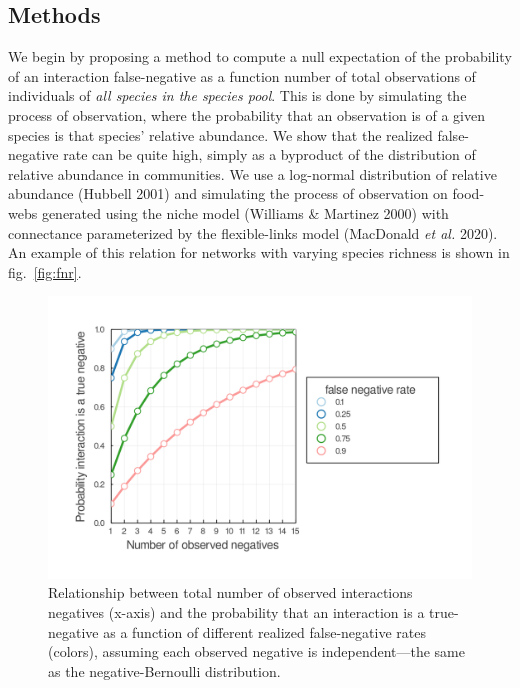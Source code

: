 \documentclass[11pt]{article}
\makeatletter
\def\maxwidth{\ifdim\Gin@nat@width>\linewidth\linewidth
\else\Gin@nat@width\fi}
\let\Oldincludegraphics\includegraphics
\renewcommand{\includegraphics}[1]{\Oldincludegraphics[width=\maxwidth]{#1}}
\makeatother
\begin{document}
\hypertarget{methods}{%
\subsection{Methods}\label{methods}}

We begin by proposing a method to compute a null expectation of the
probability of an interaction false-negative as a function number of
total observations of individuals of \emph{all species in the species
pool}. This is done by simulating the process of observation, where the
probability that an observation is of a given species is that species'
relative abundance. We show that the realized false-negative rate can be
quite high, simply as a byproduct of the distribution of relative
abundance in communities. We use a log-normal distribution of relative
abundance (Hubbell 2001) and simulating the process of observation on
food-webs generated using the niche model (Williams \& Martinez 2000)
with connectance parameterized by the flexible-links model (MacDonald
\emph{et al.} 2020). An example of this relation for networks with
varying species richness is shown in fig.~\ref{fig:fnr}.

\begin{figure}
\centering
\includegraphics{./figures/negativebinomial.png}
\caption{Relationship between total number of observed interactions
negatives (x-axis) and the probability that an interaction is a
true-negative as a function of different realized false-negative rates
(colors), assuming each observed negative is independent---the same as
the negative-Bernoulli distribution.}
\end{figure}
\end{document}
